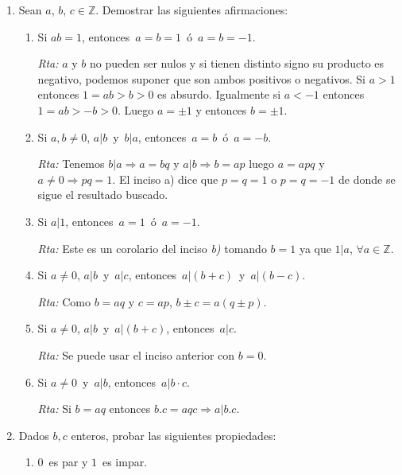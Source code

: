 \documentclass[a4paper,12pt,twoside,spanish,reqno]{amsbook}
\numberwithin{equation}{section}
\newcommand{\rta}{\noindent\textit{Rta: }}
\begin{document}
\begin{enumerate}
\begin{enumerate}
    \item
    $(10101101)_2 + (10011)_2$  \rta  $(11000000)_2$.
\end{enumerate}


\item Sean $a$, $b$, $c \in {\mathbb Z}$. Demostrar las siguientes afirmaciones:
\begin{enumerate}
    \item Si $ab=1$, entonces \,$a=b=1$\, \'o \,$a=b=-1$.
    
    \rta  $a$ y $b$ no pueden ser nulos y si tienen distinto signo su producto es negativo, podemos suponer que son ambos positivos o negativos. Si $a>1$ entonces $1=ab>b>0$ es absurdo. Igualmente si $a<-1$ entonces $1=ab >-b>0$. Luego $a=\pm1$ y entonces $b=\pm1$.
    
    \item Si $a,b \neq 0$,  $a| b$\, y \,$b | a$, entonces \,$a=b$\, \'o \,$a=-b$.
    
    \rta Tenemos $b\vert a \Rightarrow a=bq$ y   $a\vert b\Rightarrow b=ap$ luego $a=apq$ y  $a\neq0 \Rightarrow pq=1$. El inciso a)  dice que $p=q=1$ o $p=q=-1$ de donde se sigue el resultado buscado.
    
    \item Si $a | 1$, entonces \,$a=1$\, \'o \,$a=-1$.
    
    \rta Este es un corolario del inciso \textit{b)} tomando $b=1$ ya que $1\vert a$, $\forall a\in \mathbb{Z}$.
    
    \item Si $a \neq 0$, $a | b$\, y \,$a | c$, entonces \,$a | (b+c)$\, y \,$a | (b-c)$.
    
    \rta Como $b=aq$ y $c=ap$, $b\pm c=a(q\pm p)$.
    
    \item Si $a \neq 0$, $a | b$\, y \,$a | (b+c)$, entonces \,$a | c$.
    
    \rta Se puede usar el inciso anterior con $b=0$.
    
    \item Si $a \neq 0$\, y \,$a | b$, entonces \,$a| b\cdot c$.
    
    \rta Si $b=aq$ entonces $b.c=aqc \Rightarrow a\vert b.c$.
\end{enumerate}



\item Dados $b,c$ enteros, probar las siguientes propiedades:
\begin{enumerate}
    \item  $0$\, es par y $1$\, es impar.
    

\end{enumerate}
\end{enumerate}
\end{document}
